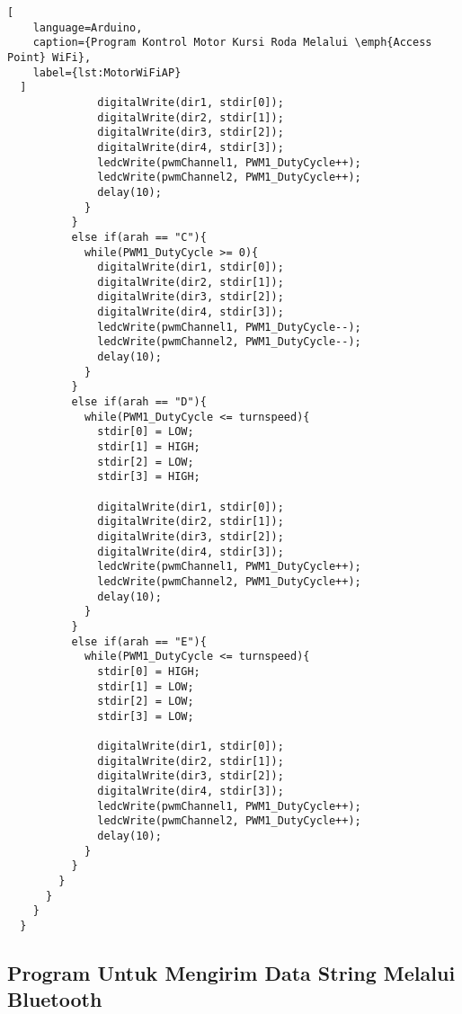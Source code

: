\begin{lstlisting}[
    language=Arduino,
    caption={Program Kontrol Motor Kursi Roda Melalui \emph{Access Point} WiFi},
    label={lst:MotorWiFiAP}
  ]
              digitalWrite(dir1, stdir[0]);
              digitalWrite(dir2, stdir[1]);
              digitalWrite(dir3, stdir[2]);
              digitalWrite(dir4, stdir[3]);
              ledcWrite(pwmChannel1, PWM1_DutyCycle++);
              ledcWrite(pwmChannel2, PWM1_DutyCycle++);
              delay(10);
            }
          }
          else if(arah == "C"){
            while(PWM1_DutyCycle >= 0){
              digitalWrite(dir1, stdir[0]);
              digitalWrite(dir2, stdir[1]);
              digitalWrite(dir3, stdir[2]);
              digitalWrite(dir4, stdir[3]);
              ledcWrite(pwmChannel1, PWM1_DutyCycle--);
              ledcWrite(pwmChannel2, PWM1_DutyCycle--);
              delay(10);
            }
          }
          else if(arah == "D"){
            while(PWM1_DutyCycle <= turnspeed){
              stdir[0] = LOW;
              stdir[1] = HIGH;
              stdir[2] = LOW;
              stdir[3] = HIGH;
  
              digitalWrite(dir1, stdir[0]);
              digitalWrite(dir2, stdir[1]);
              digitalWrite(dir3, stdir[2]);
              digitalWrite(dir4, stdir[3]);
              ledcWrite(pwmChannel1, PWM1_DutyCycle++);
              ledcWrite(pwmChannel2, PWM1_DutyCycle++);
              delay(10);
            }
          }
          else if(arah == "E"){
            while(PWM1_DutyCycle <= turnspeed){
              stdir[0] = HIGH;
              stdir[1] = LOW;
              stdir[2] = LOW;
              stdir[3] = LOW;
  
              digitalWrite(dir1, stdir[0]);
              digitalWrite(dir2, stdir[1]);
              digitalWrite(dir3, stdir[2]);
              digitalWrite(dir4, stdir[3]);
              ledcWrite(pwmChannel1, PWM1_DutyCycle++);
              ledcWrite(pwmChannel2, PWM1_DutyCycle++);
              delay(10);
            }
          }
        }
      }
    }
  }  
  \end{lstlisting}

\subsection{Program Untuk Mengirim Data String Melalui Bluetooth}

